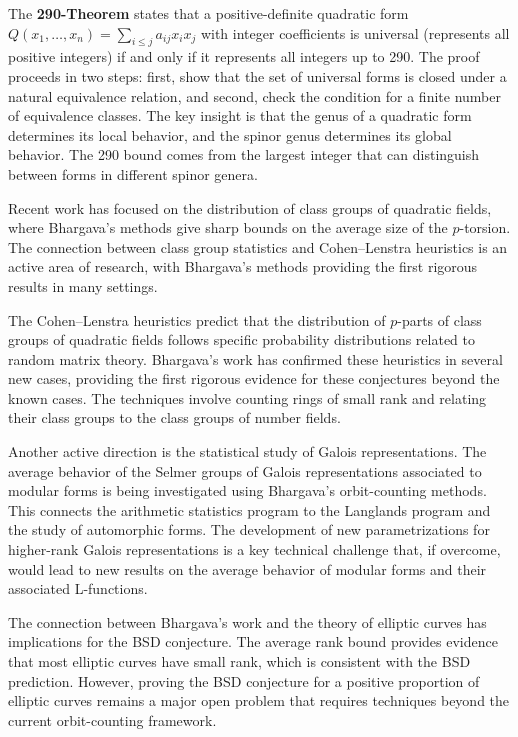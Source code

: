The \textbf{290-Theorem} states that a positive-definite quadratic form $Q(x_1, \ldots, x_n) = \sum_{i \le j} a_{ij} x_i x_j$ with integer coefficients is universal (represents all positive integers) if and only if it represents all integers up to 290. The proof proceeds in two steps: first, show that the set of universal forms is closed under a natural equivalence relation, and second, check the condition for a finite number of equivalence classes. The key insight is that the genus of a quadratic form determines its local behavior, and the spinor genus determines its global behavior. The 290 bound comes from the largest integer that can distinguish between forms in different spinor genera.

Recent work has focused on the distribution of class groups of quadratic fields, where Bhargava's methods give sharp bounds on the average size of the $p$-torsion. The connection between class group statistics and Cohen--Lenstra heuristics is an active area of research, with Bhargava's methods providing the first rigorous results in many settings.

The Cohen--Lenstra heuristics predict that the distribution of $p$-parts of class groups of quadratic fields follows specific probability distributions related to random matrix theory. Bhargava's work has confirmed these heuristics in several new cases, providing the first rigorous evidence for these conjectures beyond the known cases. The techniques involve counting rings of small rank and relating their class groups to the class groups of number fields.

Another active direction is the statistical study of Galois representations. The average behavior of the Selmer groups of Galois representations associated to modular forms is being investigated using Bhargava's orbit-counting methods. This connects the arithmetic statistics program to the Langlands program and the study of automorphic forms. The development of new parametrizations for higher-rank Galois representations is a key technical challenge that, if overcome, would lead to new results on the average behavior of modular forms and their associated L-functions.

The connection between Bhargava's work and the theory of elliptic curves has implications for the BSD conjecture. The average rank bound provides evidence that most elliptic curves have small rank, which is consistent with the BSD prediction. However, proving the BSD conjecture for a positive proportion of elliptic curves remains a major open problem that requires techniques beyond the current orbit-counting framework.

